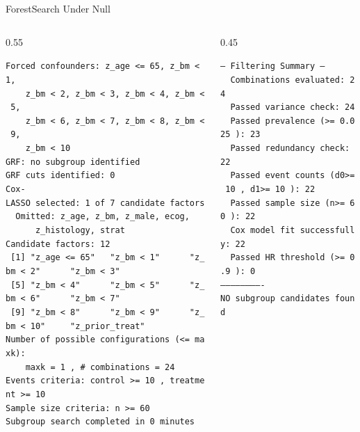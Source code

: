 \documentclass[
  ignorenonframetext,
  aspectratio=169]{beamer}
\begin{document}
\begin{frame}{ForestSearch Under Null}
\label{forestsearch-under-null}
\begin{columns}[T]
\begin{column}{0.55\textwidth}
{\tiny\raggedright
\texttt{Forced~confounders:~z\_age~<=~65,~z\_bm~<~1,~}\\[-2pt]
\texttt{~~~~z\_bm~<~2,~z\_bm~<~3,~z\_bm~<~4,~z\_bm~<~5,~}\\[-2pt]
\texttt{~~~~z\_bm~<~6,~z\_bm~<~7,~z\_bm~<~8,~z\_bm~<~9,~}\\[-2pt]
\texttt{~~~~z\_bm~<~10}\\[-2pt]
\texttt{GRF:~no~subgroup~identified}\\[-2pt]
\texttt{GRF~cuts~identified:~0}\\[-2pt]
\texttt{Cox-LASSO~selected:~1~of~7~candidate~factors}\\[-2pt]
\texttt{~~Omitted:~z\_age,~z\_bm,~z\_male,~ecog,~}\\[-2pt]
\texttt{~~~~~~z\_histology,~strat}\\[-2pt]
\texttt{Candidate~factors:~12}\\[-2pt]
\texttt{~[1]~"z\_age~<=~65"~~~"z\_bm~<~1"~~~~~~"z\_bm~<~2"~~~~~~"z\_bm~<~3"}\\[-2pt]
\texttt{~[5]~"z\_bm~<~4"~~~~~~"z\_bm~<~5"~~~~~~"z\_bm~<~6"~~~~~~"z\_bm~<~7"}\\[-2pt]
\texttt{~[9]~"z\_bm~<~8"~~~~~~"z\_bm~<~9"~~~~~~"z\_bm~<~10"~~~~~"z\_prior\_treat"}\\[-2pt]
\texttt{Number~of~possible~configurations~(<=~maxk):~}\\[-2pt]
\texttt{~~~~maxk~=~1~,~\#~combinations~=~24}\\[-2pt]
\texttt{Events~criteria:~control~>=~10~,~treatment~>=~10}\\[-2pt]
\texttt{Sample~size~criteria:~n~>=~60}\\[-2pt]
\texttt{Subgroup~search~completed~in~0~minutes}\\[-2pt]
}
\end{column}
\begin{column}{0.45\textwidth}
{\tiny\raggedright
\texttt{---~Filtering~Summary~---}\\[-2pt]
\texttt{~~Combinations~evaluated:~24}\\[-2pt]
\texttt{~~Passed~variance~check:~24}\\[-2pt]
\texttt{~~Passed~prevalence~(>=~0.025~):~23}\\[-2pt]
\texttt{~~Passed~redundancy~check:~22}\\[-2pt]
\texttt{~~Passed~event~counts~(d0>=~10~,~d1>=~10~):~22}\\[-2pt]
\texttt{~~Passed~sample~size~(n>=~60~):~22}\\[-2pt]
\texttt{~~Cox~model~fit~successfully:~22}\\[-2pt]
\texttt{~~Passed~HR~threshold~(>=~0.9~):~0}\\[-2pt]
\texttt{-------------------------}\\[-2pt]
\vspace{2pt}
\texttt{NO~subgroup~candidates~found}\\[-2pt]
}
\end{column}
\end{columns}


\end{frame}
\end{document}
